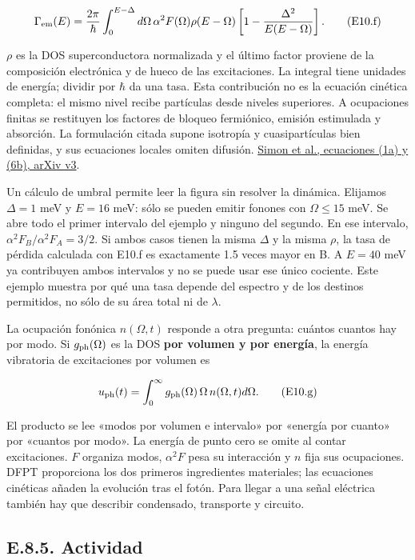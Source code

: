 \documentclass[
  spanish,
  10pt,
  a4paper,
]{article}
\newcounter{none} %
\begin{document}
\[
\Gamma_{\rm em}(E)=\frac{2\pi}{\hbar}
\int_0^{E-\Delta}d\Omega\,
\alpha^2F(\Omega)\rho(E-\Omega)
\left[1-\frac{\Delta^2}{E(E-\Omega)}\right].
\tag{E10.f}
\]

\(\rho\) es la DOS superconductora normalizada y el último factor
proviene de la composición electrónica y de hueco de las excitaciones.
La integral tiene unidades de energía; dividir por \(\hbar\) da una
tasa. Esta contribución no es la ecuación cinética completa: el mismo
nivel recibe partículas desde niveles superiores. A ocupaciones finitas
se restituyen los factores de bloqueo fermiónico, emisión estimulada y
absorción. La formulación citada supone isotropía y cuasipartículas bien
definidas, y sus ecuaciones locales omiten difusión.
\href{https://arxiv.org/html/2501.13791v3}{Simon et al., ecuaciones (1a)
y (6b), arXiv v3}.

Un cálculo de umbral permite leer la figura sin resolver la dinámica.
Elijamos \(\Delta=1\) meV y \(E=16\) meV: sólo se pueden emitir fonones
con \(\Omega\le15\) meV. Se abre todo el primer intervalo del ejemplo y
ninguno del segundo. En ese intervalo, \(\alpha^2F_B/\alpha^2F_A=3/2\).
Si ambos casos tienen la misma \(\Delta\) y la misma \(\rho\), la tasa
de pérdida calculada con E10.f es exactamente 1.5 veces mayor en B. A
\(E=40\) meV ya contribuyen ambos intervalos y no se puede usar ese
único cociente. Este ejemplo muestra por qué una tasa depende del
espectro y de los destinos permitidos, no sólo de su área total ni de
\(\lambda\).

La ocupación fonónica \(n(\Omega,t)\) responde a otra pregunta: cuántos
cuantos hay por modo. Si \(g_{\rm ph}(\Omega)\) es la DOS \textbf{por
volumen y por energía}, la energía vibratoria de excitaciones por
volumen es

\[
u_{\rm ph}(t)=\int_0^\infty
g_{\rm ph}(\Omega)\,\Omega\,n(\Omega,t)d\Omega.
\tag{E10.g}
\]

El producto se lee «modos por volumen e intervalo» por «energía por
cuanto» por «cuantos por modo». La energía de punto cero se omite al
contar excitaciones. \(F\) organiza modos, \(\alpha^2F\) pesa su
interacción y \(n\) fija sus ocupaciones. DFPT proporciona los dos
primeros ingredientes materiales; las ecuaciones cinéticas añaden la
evolución tras el fotón. Para llegar a una señal eléctrica también hay
que describir condensado, transporte y circuito.

\subsection{E.8.5. Actividad}\label{e.8.5.-actividad}
\end{document}
